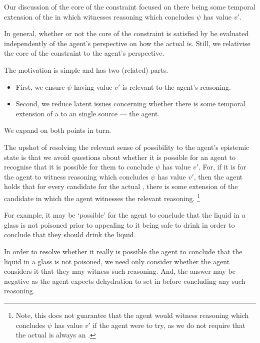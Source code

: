 \begin{note}
  Our discussion of the core of the constraint focused on there being some temporal extension of the \world{} in which \vAgent{} witnesses reasoning which concludes \(\psi\) has value \(v'\).

  In general, whether or not the core of the constraint is satisfied by be evaluated independently of the agent's perspective on how the actual \world{} is.
  Still, we relativise the core of the constraint to the agent's perspective.

  The motivation is simple and has two (related) parts.
  \begin{itemize}
  \item
    First, we ensure \(\psi\) having value \(v'\) is relevant to the agent's reasoning.
  \item
    Second, we reduce latent issues concerning whether there is some temporal extension of a \world{} to an single source --- the agent.
  \end{itemize}
  We expand on both points in turn.
\end{note}


\begin{note}
  The upshot of resolving the relevant sense of possibility to the agent's epistemic state is that we avoid questions about whether it is possible for an agent to recognise that it is possible for them to conclude \(\psi\) has value \(v'\).
  For, if it is \epVAd{} for the agent to witness reasoning which concludes \(\psi\) has value \(v'\), then the agent holds that for every candidate for the actual \world{}, there is some extension of the candidate \world{} in which the agent witnesses the relevant reasoning.\nolinebreak
  \footnote{
    Note, this does not guarantee that the agent would witness reasoning which concludes \(\psi\) has value \(v'\) if the agent were to try, as we do not require that the actual \world{} is always an \epVW{}.
  }

  For example, it may be `possible' for the agent to conclude that the liquid in a glass is not poisoned prior to appealing to it being safe to drink in order to conclude that they should drink the liquid.

  In order to resolve whether it really is possible the agent to conclude that the liquid in a glass is not poisoned, we need only consider whether the agent considers it \epVAd{} that they may witness such reasoning.
  And, the answer may be negative as the agent expects dehydration to set in before concluding any such reasoning.
\end{note}


